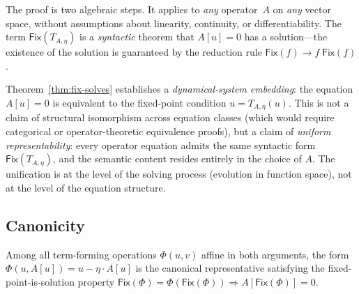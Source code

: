 \documentclass{lmcs}
\theoremstyle{plain}
\theoremstyle{definition}
\newcommand{\app}[2]{#1\;#2}
\newcommand{\fix}{\mathsf{Fix}}
\begin{document}
The proof is two algebraic steps. It applies to \emph{any} operator~$A$ on
\emph{any} vector space, without assumptions about linearity, continuity, or
differentiability. The term $\fix(T_{A,\eta})$ is a \emph{syntactic} theorem
that $A[u] = 0$ has a solution---the existence of the solution is guaranteed
by the reduction rule $\fix(f) \to \app{f}{\fix(f)}$.

\begin{rem}\label{rem:embedding-strength}
Theorem~\ref{thm:fix-solves} establishes a \emph{dynamical-system embedding}:
the equation $A[u] = 0$ is equivalent to the fixed-point condition
$u = T_{A,\eta}(u)$. This is not a claim of structural isomorphism across
equation classes (which would require categorical or operator-theoretic
equivalence proofs), but a claim of \emph{uniform representability}: every
operator equation admits the same syntactic form $\fix(T_{A,\eta})$, and the
semantic content resides entirely in the choice of $A$. The unification is at
the level of the solving process (evolution in function space), not at the
level of the equation structure.
\end{rem}

\subsection{Canonicity}

\begin{thm}\label{thm:canonicity}
Among all term-forming operations $\Phi(u, v)$ affine in both arguments, the
form $\Phi(u, A[u]) = u - \eta \cdot A[u]$ is the canonical representative
satisfying the fixed-point-is-solution property
$\fix(\Phi) = \Phi(\fix(\Phi)) \Rightarrow A[\fix(\Phi)] = 0$.
\end{thm}
\end{document}
